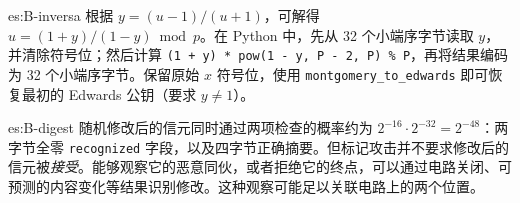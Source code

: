 \begin{soluzione}{es:B-inversa}
根据 $y=(u-1)/(u+1)$，可解得 $u=(1+y)/(1-y)\bmod p$。在 Python 中，先从 32 个小端序字节读取 $y$，并清除符号位；然后计算 \texttt{(1 + y) * pow(1 - y, P - 2, P) \% P}，再将结果编码为 32 个小端序字节。保留原始 $x$ 符号位，使用 \texttt{montgomery\_to\_edwards} 即可恢复最初的 Edwards 公钥（要求 $y \neq 1$）。
\end{soluzione}

\begin{soluzione}{es:B-digest}
随机修改后的信元同时通过两项检查的概率约为 $2^{-16}\cdot2^{-32}=2^{-48}$：两字节全零 \texttt{recognized} 字段，以及四字节正确摘要。但标记攻击并不要求修改后的信元被\emph{接受}。能够观察它的恶意同伙，或者拒绝它的终点，可以通过电路关闭、可预测的内容变化等结果识别修改。这种观察可能足以关联电路上的两个位置。
\end{soluzione}

